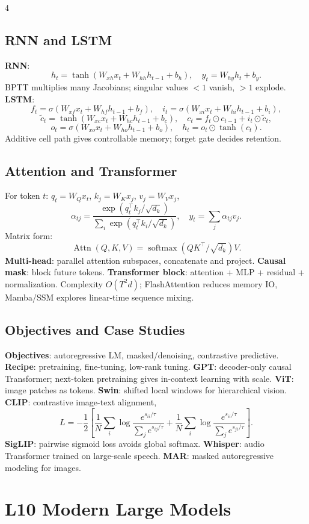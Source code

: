\documentclass{article}
\newcommand{\key}[1]{\textbf{#1}}
\newcommand{\1}{\mathbf 1}
\DeclareMathOperator{\softmax}{softmax}
\begin{document}
\begin{multicols*}{4}
\subsection{RNN and LSTM}
\key{RNN}:
\[
h_t=\tanh(W_{xh}x_t+W_{hh}h_{t-1}+b_h),\quad y_t=W_{hy}h_t+b_y.
\]
BPTT multiplies many Jacobians; singular values $<1$ vanish, $>1$ explode. \key{LSTM}:
\[
f_t=\sigma(W_{xf}x_t+W_{hf}h_{t-1}+b_f),\quad
i_t=\sigma(W_{xi}x_t+W_{hi}h_{t-1}+b_i),
\]
\[
\tilde c_t=\tanh(W_{xc}x_t+W_{hc}h_{t-1}+b_c),\quad
c_t=f_t\odot c_{t-1}+i_t\odot\tilde c_t,
\]
\[
o_t=\sigma(W_{xo}x_t+W_{ho}h_{t-1}+b_o),\quad
h_t=o_t\odot\tanh(c_t).
\]
Additive cell path gives controllable memory; forget gate decides retention.

\subsection{Attention and Transformer}
For token $t$: $q_t=W_Qx_t$, $k_j=W_Kx_j$, $v_j=W_Vx_j$,
\[
\alpha_{tj}=\frac{\exp(q_t^\top k_j/\sqrt{d_k})}{\sum_i\exp(q_t^\top k_i/\sqrt{d_k})},\quad
y_t=\sum_j\alpha_{tj}v_j.
\]
Matrix form:
\[
\operatorname{Attn}(Q,K,V)=\softmax(QK^\top/\sqrt{d_k})V.
\]
\key{Multi-head}: parallel attention subspaces, concatenate and project. \key{Causal mask}: block future tokens. \key{Transformer block}: attention + MLP + residual + normalization. Complexity $O(T^2d)$; FlashAttention reduces memory IO, Mamba/SSM explores linear-time sequence mixing.

\subsection{Objectives and Case Studies}
\key{Objectives}: autoregressive LM, masked/denoising, contrastive predictive. \key{Recipe}: pretraining, fine-tuning, low-rank tuning. \key{GPT}: decoder-only causal Transformer; next-token pretraining gives in-context learning with scale. \key{ViT}: image patches as tokens. \key{Swin}: shifted local windows for hierarchical vision. \key{CLIP}: contrastive image-text alignment,
\[
L=-\frac12\left[\frac1N\sum_i\log\frac{e^{s_{ii}/\tau}}{\sum_j e^{s_{ij}/\tau}}+
\frac1N\sum_i\log\frac{e^{s_{ii}/\tau}}{\sum_j e^{s_{ji}/\tau}}\right].
\]
\key{SigLIP}: pairwise sigmoid loss avoids global softmax. \key{Whisper}: audio Transformer trained on large-scale speech. \key{MAR}: masked autoregressive modeling for images.

\section{L10 Modern Large Models}

\end{multicols*}
\end{document}
